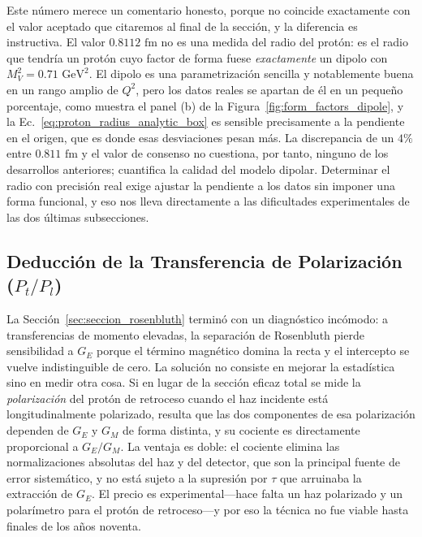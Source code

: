 \documentclass[10pt,a4paper]{article}
\begin{document}
Este número merece un comentario honesto, porque no coincide exactamente con el valor aceptado que citaremos al final de la sección, y la diferencia es instructiva. El valor $0.8112\text{ fm}$ no es una medida del radio del protón: es el radio que tendría un protón cuyo factor de forma fuese \emph{exactamente} un dipolo con $M_V^2 = 0.71\text{ GeV}^2$. El dipolo es una parametrización sencilla y notablemente buena en un rango amplio de $Q^2$, pero los datos reales se apartan de él en un pequeño porcentaje, como muestra el panel (b) de la Figura~\ref{fig:form_factors_dipole}, y la Ec.~\eqref{eq:proton_radius_analytic_box} es sensible precisamente a la pendiente en el origen, que es donde esas desviaciones pesan más. La discrepancia de un $4\%$ entre $0.811\text{ fm}$ y el valor de consenso no cuestiona, por tanto, ninguno de los desarrollos anteriores; cuantifica la calidad del modelo dipolar. Determinar el radio con precisión real exige ajustar la pendiente a los datos sin imponer una forma funcional, y eso nos lleva directamente a las dificultades experimentales de las dos últimas subsecciones.

\subsection{Deducción de la Transferencia de Polarización (\texorpdfstring{$P_t/P_l$}{Pt/Pl})}
La Sección~\ref{sec:seccion_rosenbluth} terminó con un diagnóstico incómodo: a transferencias de momento elevadas, la separación de Rosenbluth pierde sensibilidad a $G_E$ porque el término magnético domina la recta y el intercepto se vuelve indistinguible de cero. La solución no consiste en mejorar la estadística sino en medir otra cosa. Si en lugar de la sección eficaz total se mide la \emph{polarización} del protón de retroceso cuando el haz incidente está longitudinalmente polarizado, resulta que las dos componentes de esa polarización dependen de $G_E$ y $G_M$ de forma distinta, y su cociente es directamente proporcional a $G_E/G_M$. La ventaja es doble: el cociente elimina las normalizaciones absolutas del haz y del detector, que son la principal fuente de error sistemático, y no está sujeto a la supresión por $\tau$ que arruinaba la extracción de $G_E$. El precio es experimental---hace falta un haz polarizado y un polarímetro para el protón de retroceso---y por eso la técnica no fue viable hasta finales de los años noventa.
\end{document}
